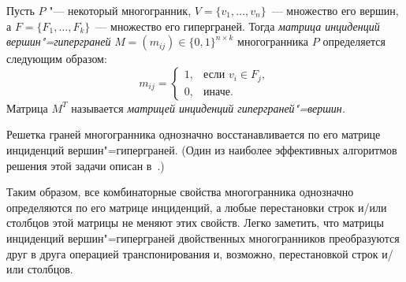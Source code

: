 Пусть $P$ "--- некоторый многогранник, $V = \{v_1, \dots, v_n\}$~--- множество его вершин,
а $F = \{F_1, \dots, F_k\}$~--- множество его гиперграней.
Тогда \emph{матрица инциденций вершин"=гиперграней} $M=(m_{ij})\in \{0,1\}^{n\times k}$ 
многогранника $P$ определяется следующим образом:
\[
m_{ij} = \begin{cases}
1, & \text{если } v_i \in F_j,\\
0, & \text{иначе.}
\end{cases}
\]
Матрица $M^T$ называется \emph{матрицей инциденций гиперграней"=вершин.}

Решетка граней многогранника однозначно восстанавливается по его матрице инциденций вершин"=гиперграней. 
(Один из наиболее эффективных алгоритмов решения этой задачи описан в~\cite{KaibelP:02}.)
\begin{comment}
Так, например, диаграмма Хассе на рис.~\ref{fig:cube7Hasse} восстанавливается по матрице инциденций
\begin{equation}
\begin{pmatrix}
1 & 1 & 1 & 1 & 0 & 1 & 0 & 0 \\
1 & 1 & 1 & 0 & 1 & 0 & 1 & 0 \\
1 & 1 & 0 & 1 & 1 & 0 & 0 & 1 \\
1 & 0 & 1 & 0 & 0 & 1 & 1 & 0 \\
1 & 0 & 0 & 1 & 0 & 1 & 0 & 1 \\
1 & 0 & 0 & 0 & 1 & 0 & 1 & 1 \\
1 & 0 & 0 & 0 & 0 & 1 & 1 & 1 \\
0 & 1 & 1 & 1 & 1 & 1 & 1 & 1 \\
\end{pmatrix}
\label{eq:Minc}
\end{equation}
\end{comment}
Таким образом, все 
комбинаторные свойства многогранника однозначно определяются по его матрице инциденций, а любые перестановки строк и/или столбцов этой матрицы не меняют этих свойств.
Легко заметить, что матрицы инциденций вершин"=гиперграней двойственных многогранников преобразуются друг в друга операцией транспонирования и, возможно, перестановкой строк и/или столбцов.


